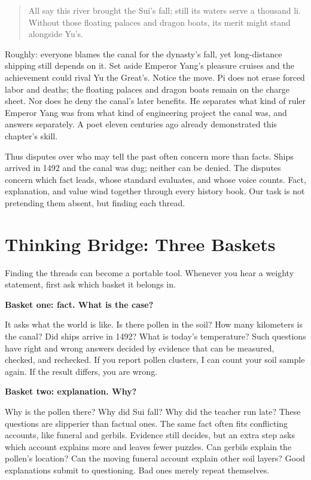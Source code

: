 \begin{quote}
All say this river brought the Sui's fall; still its waters serve a thousand li. Without those floating palaces and dragon boats, its merit might stand alongside Yu's.
\end{quote}
Roughly: everyone blames the canal for the dynasty's fall, yet long-distance shipping still depends on it. Set aside Emperor Yang's pleasure cruises and the achievement could rival Yu the Great's. Notice the move. Pi does not erase forced labor and deaths; the floating palaces and dragon boats remain on the charge sheet. Nor does he deny the canal's later benefits. He separates what kind of ruler Emperor Yang was from what kind of engineering project the canal was, and answers separately. A poet eleven centuries ago already demonstrated this chapter's skill.

Thus disputes over who may tell the past often concern more than facts. Ships arrived in 1492 and the canal was dug; neither can be denied. The disputes concern which fact leads, whose standard evaluates, and whose voice counts. Fact, explanation, and value wind together through every history book. Our task is not pretending them absent, but finding each thread.

\section{Thinking Bridge: Three Baskets}
Finding the threads can become a portable tool. Whenever you hear a weighty statement, first ask which basket it belongs in.

\textbf{Basket one: fact. What is the case?}

It asks what the world is like. Is there pollen in the soil? How many kilometers is the canal? Did ships arrive in 1492? What is today's temperature? Such questions have right and wrong answers decided by evidence that can be measured, checked, and rechecked. If you report pollen clusters, I can count your soil sample again. If the result differs, you are wrong.

\textbf{Basket two: explanation. Why?}

Why is the pollen there? Why did Sui fall? Why did the teacher run late? These questions are slipperier than factual ones. The same fact often fits conflicting accounts, like funeral and gerbils. Evidence still decides, but an extra step asks which account explains more and leaves fewer puzzles. Can gerbils explain the pollen's location? Can the moving funeral account explain other soil layers? Good explanations submit to questioning. Bad ones merely repeat themselves.

